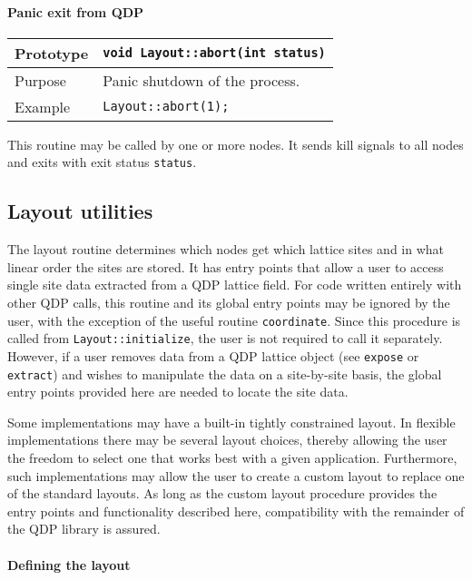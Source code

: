 \documentclass[12pt,letterpaper]{article}
\begin{document}
\paragraph{Panic exit from QDP}

\begin{flushleft}
  \begin{tabular}{|l|l|}
  \hline
  Prototype      & \verb|void Layout::abort(int status)|\\
    \hline
  Purpose        & Panic shutdown of the process. \\
\hline
  Example  & \verb|Layout::abort(1);| \\
   \hline
 \end{tabular}
\end{flushleft}
%
This routine may be called by one or more nodes.  It sends kill
signals to all nodes and exits with exit status \verb|status|.

\subsection{Layout utilities}

The layout routine determines which nodes get which lattice sites and
in what linear order the sites are stored.  It has entry points that
allow a user to access single site data extracted from a QDP lattice
field.  For code written entirely with other QDP calls, this routine
and its global entry points may be ignored by the user, with the
exception of the useful routine \verb|coordinate|.  Since this
procedure is called from \verb|Layout::initialize|, the user is not
required to call it separately.  However, if a user removes data from
a QDP lattice object (see \verb|expose| or \verb|extract|) and
wishes to manipulate the data on a site-by-site basis, the global
entry points provided here are needed to locate the site data.

Some implementations may have a built-in tightly constrained layout.
In flexible implementations there may be several layout choices,
thereby allowing the user the freedom to select one that works best
with a given application.  Furthermore, such implementations may allow
the user to create a custom layout to replace one of the standard
layouts.  As long as the custom layout procedure provides the entry
points and functionality described here, compatibility with the
remainder of the QDP library is assured.

\paragraph{Defining the layout}
\end{document}
